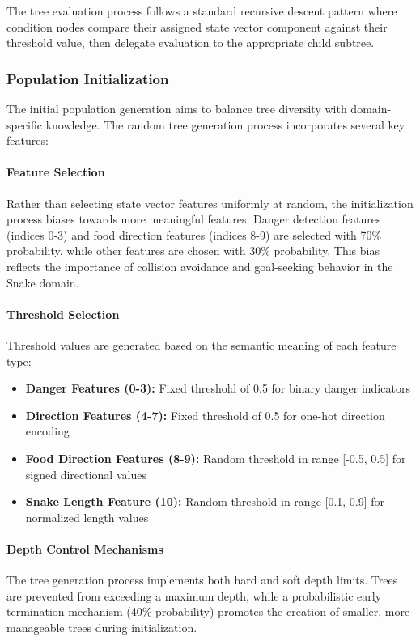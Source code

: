 \documentclass[a4paper,12pt]{article}
\begin{document}
The tree evaluation process follows a standard recursive descent pattern where condition nodes compare their assigned state vector component against their threshold value, then delegate evaluation to the appropriate child subtree.

\subsubsection{Population Initialization}

The initial population generation aims to balance tree diversity with domain-specific knowledge. The random tree generation process incorporates several key features:

\paragraph{Feature Selection} Rather than selecting state vector features uniformly at random, the initialization process biases towards more meaningful features. Danger detection features (indices 0-3) and food direction features (indices 8-9) are selected with 70\% probability, while other features are chosen with 30\% probability. This bias reflects the importance of collision avoidance and goal-seeking behavior in the Snake domain.

\paragraph{Threshold Selection} Threshold values are generated based on the semantic meaning of each feature type:
\begin{itemize}
   \item \textbf{Danger Features (0-3):} Fixed threshold of 0.5 for binary danger indicators
   \item \textbf{Direction Features (4-7):} Fixed threshold of 0.5 for one-hot direction encoding
   \item \textbf{Food Direction Features (8-9):} Random threshold in range [-0.5, 0.5] for signed directional values
   \item \textbf{Snake Length Feature (10):} Random threshold in range [0.1, 0.9] for normalized length values
\end{itemize}

\paragraph{Depth Control Mechanisms} The tree generation process implements both hard and soft depth limits. Trees are prevented from exceeding a maximum depth, while a probabilistic early termination mechanism (40\% probability) promotes the creation of smaller, more manageable trees during initialization.
\end{document}
